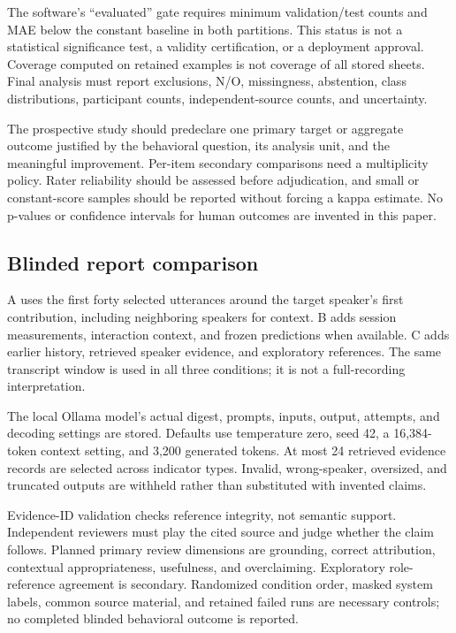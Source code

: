 \documentclass{article}
\begin{document}
The software's ``evaluated'' gate requires minimum validation/test counts and MAE below the constant baseline in both partitions. This status is not a statistical significance test, a validity certification, or a deployment approval. Coverage computed on retained examples is not coverage of all stored sheets. Final analysis must report exclusions, N/O, missingness, abstention, class distributions, participant counts, independent-source counts, and uncertainty.

The prospective study should predeclare one primary target or aggregate outcome justified by the behavioral question, its analysis unit, and the meaningful improvement. Per-item secondary comparisons need a multiplicity policy. Rater reliability should be assessed before adjudication, and small or constant-score samples should be reported without forcing a kappa estimate. No p-values or confidence intervals for human outcomes are invented in this paper.

\subsection{Blinded report comparison}
A uses the first forty selected utterances around the target speaker's first contribution, including neighboring speakers for context. B adds session measurements, interaction context, and frozen predictions when available. C adds earlier history, retrieved speaker evidence, and exploratory references. The same transcript window is used in all three conditions; it is not a full-recording interpretation.

The local Ollama model's actual digest, prompts, inputs, output, attempts, and decoding settings are stored. Defaults use temperature zero, seed 42, a 16,384-token context setting, and 3,200 generated tokens. At most 24 retrieved evidence records are selected across indicator types. Invalid, wrong-speaker, oversized, and truncated outputs are withheld rather than substituted with invented claims.

Evidence-ID validation checks reference integrity, not semantic support. Independent reviewers must play the cited source and judge whether the claim follows. Planned primary review dimensions are grounding, correct attribution, contextual appropriateness, usefulness, and overclaiming. Exploratory role-reference agreement is secondary. Randomized condition order, masked system labels, common source material, and retained failed runs are necessary controls; no completed blinded behavioral outcome is reported.
\end{document}
